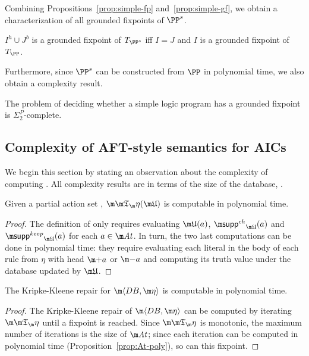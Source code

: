 Combining Propositions~\ref{prop:simple-fp} and~\ref{prop:simple-gf}, we obtain a characterization of all grounded fixpoints of $\PP^s$.

\begin{corollary}
  $I^h\cup J^b$ is a grounded fixpoint of $T_{\PP^s}$ iff $I=J$ and $I$ is a grounded fixpoint of $T_\PP$.
\end{corollary}

Furthermore, since $\PP^s$ can be constructed from $\PP$ in polynomial time, we also obtain a complexity result.

\begin{corollary}
  \label{cor:simple-has-gf}
  The problem of deciding whether a simple logic program has a grounded fixpoint is $\Sigma^P_2$-complete.
\end{corollary}


\subsection{Complexity of AFT-style semantics for AICs}



We begin this section by stating an observation about the complexity of computing \Ap.
All complexity results are in terms of the size of the database, \fulldb.
\begin{proposition}
  \label{prop:At-poly}
  Given a partial action set \UUU, 
  $\Ap(\UUU)$ is computable in polynomial time. %
\end{proposition}
\begin{proof}
    The definition of \Ap only requires evaluating $\UUU(a)$, $\suppin_{\UUU}(a)$ and $\suppout_{\UUU}(a)$ for each $a\in\atoms$.
    In turn, the two last computations can be done in polynomial time: they require evaluating each literal in the body of each rule from $\eta$ with head $\add a$ or $\remove a$ and computing its truth value under the database updated by $\UUU$.
\end{proof}


\begin{proposition}
  The Kripke-Kleene repair for $\fulldb$ is computable in polynomial time.
  \label{prop:KK-poly}
\end{proposition}
\begin{proof}
  The Kripke-Kleene repair of $\fulldb$ can be computed by iterating $\Ap$ until a fixpoint is reached.
  Since $\Ap$ is monotonic, the maximum number of iterations is the size of $\atoms$; since each iteration can be computed in polynomial time (Proposition~\ref{prop:At-poly}), so can this fixpoint.
\end{proof}

